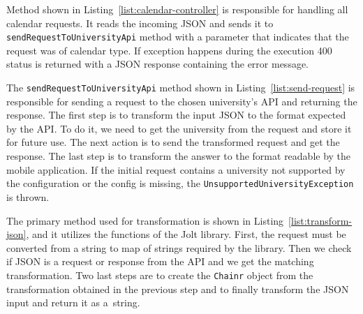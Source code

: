 Method shown in Listing~\ref{list:calendar-controller} is responsible for handling all calendar requests. It reads the incoming JSON and sends it to \texttt{sendRequestToUniversityApi} method with a parameter that indicates that the request was of calendar type. If exception happens during the execution 400 status is returned with a JSON response containing the error message.



The \texttt{sendRequestToUniversityApi} method shown in Listing~\ref{list:send-request} is responsible for sending a request to the chosen university's API and returning the response. The first step is to transform the input JSON to the format expected by the API. To do it, we need to get the university from the request and store it for future use. The next action is to send the transformed request and get the response. The last step is to transform the answer to the format readable by the mobile application. If the initial request contains a university not supported by the configuration or the config is missing, the \texttt{UnsupportedUniversityException} is thrown.



The primary method used for transformation is shown in Listing~\ref{list:transform-json}, and it utilizes the functions of the Jolt library. First, the request must be converted from a string to map of strings required by the library. Then we check if JSON is a request or response from the API and we get the matching transformation. Two last steps are to create the \texttt{Chainr} object from the transformation obtained in the previous step and to finally transform the JSON input and return it as a~string.


